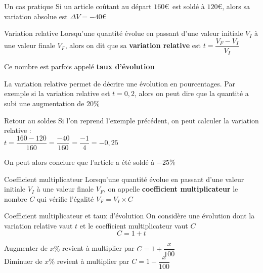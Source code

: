 \documentclass[oneside,12pt]{article}          %
\begin{document}
\begin{exemple}{Un cas pratique}
	Si un article coûtant au départ $160$\euro\, est soldé à $120$\euro, alors sa variation absolue est $ \Delta V = -40$\euro
\end{exemple}


\begin{definition}{Variation relative}
	Lorsqu'une quantité évolue en passant d'une valeur initiale $V_I$ à une valeur finale $V_F$, alors on dit que sa \textbf{variation relative} est $t = \dfrac{V_F - V_I}{V_I}$
	
	Ce nombre est parfois appelé \textbf{taux d'évolution}
\end{definition}

\begin{remarque}
	La variation relative permet de décrire une évolution en pourcentages. Par exemple si la variation relative est $t = 0,2$, alors on peut dire que la quantité a subi une augmentation de $20\%$
\end{remarque}

\begin{exemple}{Retour au soldes}
	Si l'on reprend l'exemple précédent, on peut calculer la variation relative :\\
	$t = \dfrac{160 - 120}{160} = \dfrac{-40}{160} = \dfrac{-1}{4} = -0,25$
	
	On peut alors conclure que l'article a été soldé à $-25\%$
\end{exemple}



\begin{definition}{Coefficient multiplicateur}
	Lorsqu'une quantité évolue en passant d'une valeur initiale $V_I$ à une valeur finale $V_F$, on appelle \textbf{coefficient multiplicateur} le nombre $C$ qui vérifie l'égalité $V_F = V_I \times C$
\end{definition}



\begin{propriete}{Coefficient multiplicateur et taux d'évolution}
	On considère une évolution dont la variation relative vaut $t$ et le coefficient multiplicateur vaut $C$
	\[ C = 1 + t \]
\end{propriete}

\begin{remarque}
	Augmenter de $x\%$ revient à multiplier par $C = 1 + \dfrac{x}{100}$ \\
	Diminuer de $x\%$ revient à multiplier par $C = 1 - \dfrac{x}{100}$
\end{remarque}
\end{document}
